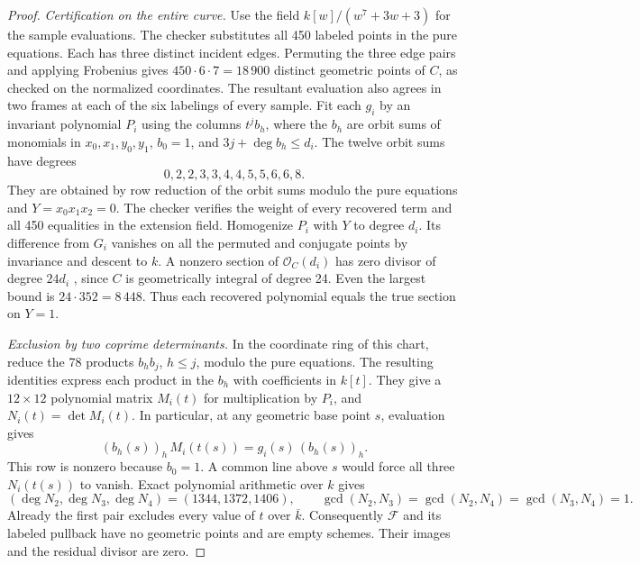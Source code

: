 \begin{proof}
\emph{Certification on the entire curve.}
Use the field \(k[w]/(w^7+3w+3)\) for the sample evaluations.
The checker substitutes all 450 labeled points in the pure equations.
Each has three distinct incident edges. Permuting the three edge pairs
and applying Frobenius gives \(450\cdot6\cdot7=18\,900\) distinct
geometric points of \(C\), as checked on the normalized coordinates.
The resultant evaluation also agrees in two frames at each of the
six labelings of every sample.
Fit each \(g_i\) by an invariant polynomial \(P_i\) using the columns
\(t^j b_h\), where the \(b_h\) are orbit sums of monomials in
\(x_0,x_1,y_0,y_1\), \(b_0=1\), and \(3j+\deg b_h\le d_i\).
The twelve orbit sums have degrees
\[
              0,2,2,3,3,4,4,5,5,6,6,8 .
\]
They are obtained by row reduction of the orbit sums modulo the pure
equations and \(Y=x_0x_1x_2=0\). The checker verifies the weight of
every recovered term and all 450 equalities in the extension field.
Homogenize \(P_i\) with \(Y\) to degree \(d_i\). Its difference
from \(G_i\) vanishes on all the permuted and conjugate points by
invariance and descent to \(k\). A nonzero section of
\(\mathcal O_C(d_i)\) has zero divisor of degree \(24d_i\)
\cite{stacksCurveDegrees}, since
\(C\) is geometrically integral of degree 24. Even the largest
bound is \(24\cdot352=8\,448\). Thus each recovered polynomial
equals the true section on \(Y=1\).

\emph{Exclusion by two coprime determinants.}
In the coordinate ring of this chart, reduce the 78 products
\(b_h b_j\), \(h\le j\), modulo the pure equations. The resulting
identities express each product in the \(b_h\) with coefficients in
\(k[t]\). They give a \(12\times12\) polynomial matrix \(M_i(t)\)
for multiplication by \(P_i\), and \(N_i(t)=\det M_i(t)\).
In particular, at any geometric base point \(s\), evaluation gives
\[
 (b_h(s))_h\,M_i(t(s))=g_i(s)\,(b_h(s))_h .
\]
This row is nonzero because \(b_0=1\). A common line above \(s\)
would force all three \(N_i(t(s))\) to vanish. Exact polynomial
arithmetic over \(k\) gives
\[
  (\deg N_2,\deg N_3,\deg N_4)=(1344,1372,1406),
  \qquad \gcd(N_2,N_3)=\gcd(N_2,N_4)=\gcd(N_3,N_4)=1 .
\]
Already the first pair excludes every value of \(t\) over
\(\overline k\). Consequently \(\mathcal F\) and its labeled
pullback have no geometric points and are empty schemes. Their
images and the residual divisor are zero.
\end{proof}

